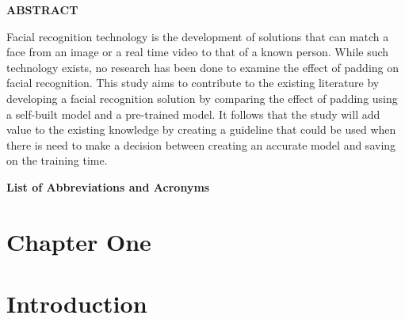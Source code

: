 \documentclass[
  12pt,
]{report}
\begin{document}
\newpage

\begin{centering}

{\bf ABSTRACT}

\end{centering}

\onehalfspacing
\normalsize

Facial recognition technology is the development of solutions that can
match a face from an image or a real time video to that of a known
person. While such technology exists, no research has been done to
examine the effect of padding on facial recognition. This study aims to
contribute to the existing literature by developing a facial recognition
solution by comparing the effect of padding using a self-built model and
a pre-trained model. It follows that the study will add value to the
existing knowledge by creating a guideline that could be used when there
is need to make a decision between creating an accurate model and saving
on the training time.

\newpage
\centering
\raggedright
\newpage
\normalsize
\onehalfspacing
\tableofcontents

\onehalfspacing
\normalsize
\newpage
\listoffigures

\newpage
\onehalfspacing
\normalsize
\listoftables

\newpage

\large

\doublespacing

\begin{centering}

{\bf List of Abbreviations and Acronyms}

\end{centering}

\newpage


\doublespacing
\normalsize
\justifying

\chapter{Chapter One}\label{chapter-one}

\vspace{-1em}

\chapter*{Introduction}\label{introduction}
\end{document}
